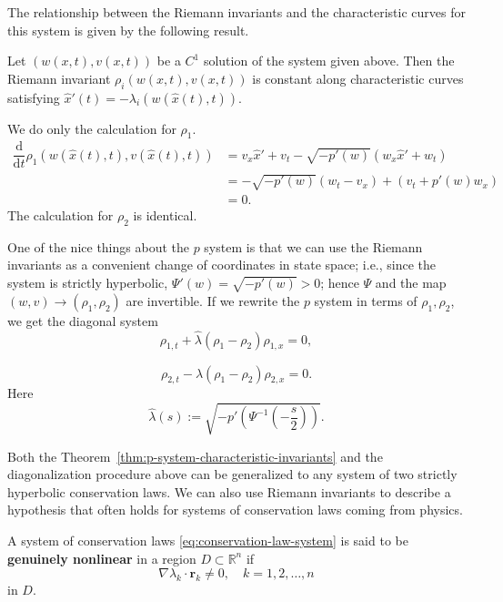 The relationship between the Riemann invariants and the characteristic curves for this system is given by the following result.

\begin{Theorem}
\label{thm:p-system-characteristic-invariants}
Let $(w(x,t),v(x,t))$ be a $C^1$ solution of the system given above. Then the Riemann invariant $\rho_i(w(x,t),v(x,t))$ is constant along characteristic curves satisfying $\hat x'(t)=-\lambda_i(w(\hat x(t),t))$.
\end{Theorem}

\begin{Proof}
We do only the calculation for $\rho_1$.
\[
\begin{aligned}
\dfrac{\mathrm{d}}{\mathrm{d}t}\rho_1(w(\hat x(t),t),v(\hat x(t),t))
&=v_x\hat x'+v_t-\sqrt{-p'(w)}(w_x\hat x'+w_t)\\
&=-\sqrt{-p'(w)}(w_t-v_x)+(v_t+p'(w)w_x)\\
&=0.
\end{aligned}
\]
The calculation for $\rho_2$ is identical.
\end{Proof}

One of the nice things about the $p$ system is that we can use the Riemann invariants as a convenient change of coordinates in state space; i.e., since the system is strictly hyperbolic, $\Psi'(w)=\sqrt{-p'(w)}>0$; hence $\Psi$ and the map $(w,v)\to(\rho_1,\rho_2)$ are invertible. If we rewrite the $p$ system in terms of $\rho_1,\rho_2$, we get the diagonal system
\begin{equation}\label{eq:p-system-diagonal-first}
\rho_{1,t}+\hat\lambda(\rho_1-\rho_2)\rho_{1,x}=0,
\end{equation}

\begin{equation}\label{eq:p-system-diagonal-second}
\rho_{2,t}-\hat\lambda(\rho_1-\rho_2)\rho_{2,x}=0.
\end{equation}
Here
\begin{equation}\label{eq:p-system-diagonal-speed}
\hat\lambda(s):=\sqrt{-p'\left(\Psi^{-1}\left(-\dfrac{s}{2}\right)\right)}.
\end{equation}


Both the Theorem~\ref{thm:p-system-characteristic-invariants} and the diagonalization procedure above can be generalized to any system of two strictly hyperbolic conservation laws. We can also use Riemann invariants to describe a hypothesis that often holds for systems of conservation laws coming from physics.

\begin{Definition}
\label{def:genuine-nonlinearity}
A system of conservation laws \eqref{eq:conservation-law-system} is said to be \textbf{genuinely nonlinear} in a region $D\subset\mathbb{R}^n$ if
\begin{equation}\label{eq:genuine-nonlinearity-definition}
\nabla\lambda_k\cdot\bm{r}_k\ne0,\quad k=1,2,\ldots,n
\end{equation}
in $D$.
\end{Definition}

